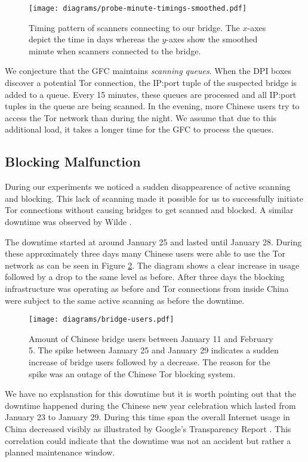 \documentclass[runningheads,a4paper]{llncs}
\begin{document}
\begin{figure}
\centering
\texttt{[image: diagrams/probe-minute-timings-smoothed.pdf]}
\caption{Timing pattern of scanners connecting to our bridge. The $x$-axes depict the time in days
whereas the $y$-axes show the smoothed minute when scanners connected to the bridge.}
\label{fig:diurnal}
\end{figure}

We conjecture that the GFC maintains \emph{scanning queues}. When the DPI boxes discover a potential
Tor connection, the IP:port tuple of the suspected bridge is added to a queue. Every 15 minutes,
these queues are processed and all IP:port tuples in the queue are being scanned. In the evening,
more Chinese users try to access the Tor network than during the night. We assume that due to this
additional load, it takes a longer time for the GFC to process the queues.

\subsection{Blocking Malfunction}
During our experiments we noticed a sudden disappearence of active scanning and blocking. This lack
of scanning made it possible for us to successfully initiate Tor connections without causing bridges
to get scanned and blocked. A similar downtime was observed by Wilde \cite{tpo5}.

The downtime started at around January 25 and lasted until January 28. During these
approximately three days many Chinese users were able to use the Tor network as can be seen in
Figure \ref{fig:offline}. The diagram shows a clear increase in usage followed by a drop to the same
level as before. After three days the blocking infrastructure was operating as before and Tor
connections from inside China were subject to the same active scanning as before the downtime.

\begin{figure}
\centering
\texttt{[image: diagrams/bridge-users.pdf]}
\caption{Amount of Chinese bridge users between January 11 and February 5. The spike between January
25 and January 29 indicates a sudden increase of bridge users followed by a decrease. The reason for
the spike was an outage of the Chinese Tor blocking system.}
\label{fig:offline}
\end{figure}

We have no explanation for this downtime but it is worth pointing out that the downtime happened
during the Chinese new year celebration which lasted from January 23 to January 29. During this time
span the overall Internet usage in China decreased visibly as illustrated by Google's Transparency
Report \cite{trans}. This correlation could indicate that the downtime was not an accident but
rather a planned maintenance window.
\end{document}
